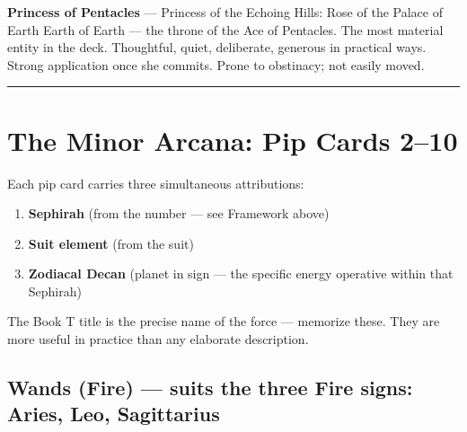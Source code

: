 \textbf{Princess of Pentacles} --- Princess of the Echoing Hills: Rose of the Palace of Earth Earth of Earth --- the throne of the Ace of Pentacles. The most material entity in the deck. Thoughtful, quiet, deliberate, generous in practical ways. Strong application once she commits. Prone to obstinacy; not easily moved.

\begin{center}\rule{0.5\linewidth}{0.5pt}\end{center}

\section{The Minor Arcana: Pip Cards 2--10}\label{the-minor-arcana-pip-cards-210}

Each pip card carries three simultaneous attributions:

\begin{enumerate}
\def\labelenumi{\arabic{enumi}.}
\tightlist
\item
  \textbf{Sephirah} (from the number --- see Framework above)
\item
  \textbf{Suit element} (from the suit)
\item
  \textbf{Zodiacal Decan} (planet in sign --- the specific energy operative within that Sephirah)
\end{enumerate}

The Book T title is the precise name of the force --- memorize these. They are more useful in practice than any elaborate description.

\subsection{Wands (Fire) --- suits the three Fire signs: Aries, Leo, Sagittarius}\label{wands-fire--suits-the-three-fire-signs-aries-leo-sagittarius}

